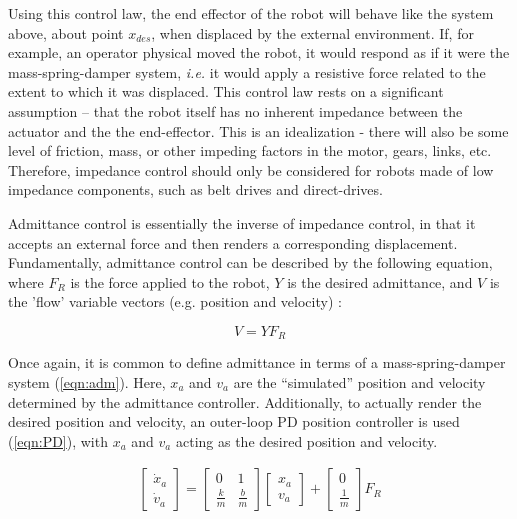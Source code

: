\documentclass[12pt]{report}
\begin{document}
Using this control law, the end effector of the robot will behave like the system above, about point $x_{des}$, when displaced by the external environment. If, for example, an operator physical moved the robot, it would respond as if it were the mass-spring-damper system, \textit{i.e.} it would apply a resistive force related to the extent to which it was displaced. 
	This control law rests on a significant assumption -- that the robot itself has no inherent impedance between the actuator and the the end-effector. This is an idealization - there will also be some level of friction, mass, or other impeding factors in the motor, gears, links, etc. Therefore, impedance control should only be considered for robots made of low impedance components, such as belt drives and direct-drives. 
	
	Admittance control is essentially the inverse of impedance control, in that it accepts an external force and then renders a corresponding displacement. Fundamentally, admittance control can be described by the following equation, where $F_R$ is the force applied to the robot, $Y$ is the desired admittance, and $V$ is the 'flow' variable vectors (e.g. position and velocity) :
	
	\begin{equation}
	V = YF_R 
	\end{equation} 
	
	Once again, it is common to define admittance in terms of a mass-spring-damper system (\ref{eqn:adm}). Here, $x_a$ and $v_a$ are the ``simulated'' position and velocity determined by the admittance controller. Additionally, to actually render the desired position and velocity, an outer-loop PD position controller is used (\ref{eqn:PD}), with $x_a$ and $v_a$ acting as the desired position and velocity. 
	
	\begin{gather} \label{eqn:adm}
	\begin{bmatrix}
    	\dot{x}_a \\
    	\dot{v}_a 
    \end{bmatrix} 
    =
    \begin{bmatrix}
    	0 & 1 \\
    	\frac{k}{m} & \frac{b}{m}
    \end{bmatrix} 
    \begin{bmatrix}
    	x_a \\
    	v_a
    \end{bmatrix}  
    +
    \begin{bmatrix}
    	0 \\
    	\frac{1}{m}
    \end{bmatrix}
    F_R   	
	\end{gather}
	
\end{document}
